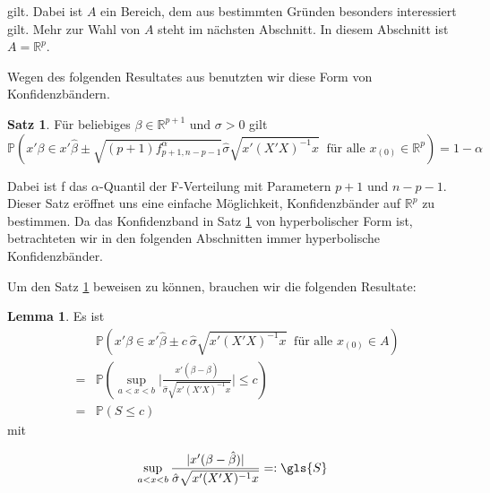 \documentclass[12pt,a4paper]{article}
\theoremstyle{definition}
\theoremstyle{definition}
\newtheorem{Satz}[Definition]{Satz}
\theoremstyle{definition}
\theoremstyle{definition}
\newtheorem{Lemma}[Definition]{Lemma}
\begin{document}
gilt. Dabei ist $A$ ein Bereich, dem aus bestimmten Gründen besonders interessiert gilt. Mehr zur Wahl von $A$ steht im nächsten Abschnitt. In diesem Abschnitt ist $A = \mathbb{R}^p$.

Wegen des folgenden Resultates aus \cite[66]{Liu64} benutzten wir diese Form von Konfidenzbändern.

\begin{Satz} \label{KB_Eigenschaft}
Für beliebiges $\beta \in \mathbb{R}^{p+1}$ und $\sigma > 0$ gilt 
\begin{equation*}
\mathbb{P}( x'\beta \in x' \hat{\beta} \pm \sqrt{(p+1) f^{\alpha}_{p+1,n-p-1}} \hat{\sigma} \sqrt{x' (X'X)^{-1}x} ~ \text{ für alle } x_{(0)} \in \mathbb{R}^p) = 1 - \alpha
\end{equation*}
\end{Satz} 

Dabei ist \gls{f} das $\alpha$-Quantil der F-Verteilung mit Parametern $p+1$ und $n-p-1$. Dieser Satz eröffnet uns eine einfache Möglichkeit, Konfidenzbänder auf $\mathbb{R}^p$ zu bestimmen. Da das Konfidenzband in Satz \ref{KB_Eigenschaft} von hyperbolischer Form ist, betrachteten wir in den folgenden Abschnitten immer hyperbolische Konfidenzbänder.

Um den Satz \ref{KB_Eigenschaft} beweisen zu können, brauchen wir die folgenden Resultate:

\begin{Lemma} \label{Basiseigenschaft}
Es ist
\begin{eqnarray*}
&&\mathbb{P}( x'\beta \in x' \hat{\beta} \pm c ~ \hat{\sigma} \sqrt{x' (X'X)^{-1} x} ~ \text{ für alle } x_{(0)} \in A ) \\
&=& \mathbb{P}( \sup_{a<x<b} \bigg \vert \frac{x'(\beta - \hat{\beta})}{\hat{\sigma} \sqrt{x'(X'X)^{-1}x}} \bigg \vert \leq c) \\
&=& \mathbb{P}( S \leq c)
\end{eqnarray*}
mit 

\begin{equation*}
\sup_{a<x<b} \frac{\vert x'(\beta - \hat{\beta}) \vert}{\hat{\sigma} \sqrt{x'(X'X)^{-1}x}}  =:  \gls{S}
\end{equation*}

\end{Lemma}
\end{document}
